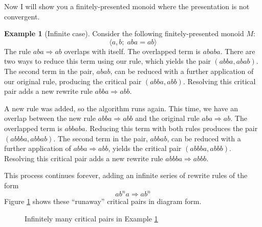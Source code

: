 \documentclass[headsepline,bibliography=totoc]{scrreport}
\theoremstyle{definition}
\newtheorem{example}{Example}[chapter]
\theoremstyle{definition}
\theoremstyle{definition}
\begin{document}
Now I will show you a finitely-presented monoid where the presentation is not convergent.
\begin{example}[Infinite case]\label{infiniteex}
Consider the following finitely-presented monoid $M$:
\[\langle a, b;\; aba=ab\rangle\]
The rule $aba\Rightarrow ab$ overlaps with itself. The overlapped term is $ababa$. There are two ways to reduce this term using our rule, which yields the pair $(abba, abab)$. The second term in the pair, $abab$, can be reduced with a further application of our original rule, producing the critical pair $(abba, abb)$. Resolving this critical pair adds a new rewrite rule $abba\Rightarrow abb$.

A new rule was added, so the algorithm runs again. This time, we have an overlap between the new rule $abba\Rightarrow abb$ and the original rule $aba\Rightarrow ab$. The overlapped term is $abbaba$. Reducing this term with both rules produces the pair $(abbba, abbab)$. The second term in the pair, $abbab$, can be reduced with a further application of $abba\Rightarrow abb$, yields the critical pair $(abbba, abbb)$. Resolving this critical pair adds a new rewrite rule $abbba\Rightarrow abbb$.

This process continues forever, adding an infinite series of rewrite rules of the form
\[ab^na\Rightarrow ab^n\]
Figure \ref{infinitefig} shows these ``runaway'' critical pairs in diagram form.
\begin{figure}\caption{Infinitely many critical pairs in Example \ref{infiniteex}}\label{infinitefig}
\begin{center}
\end{center}
\end{figure}
\end{example}
\end{document}

